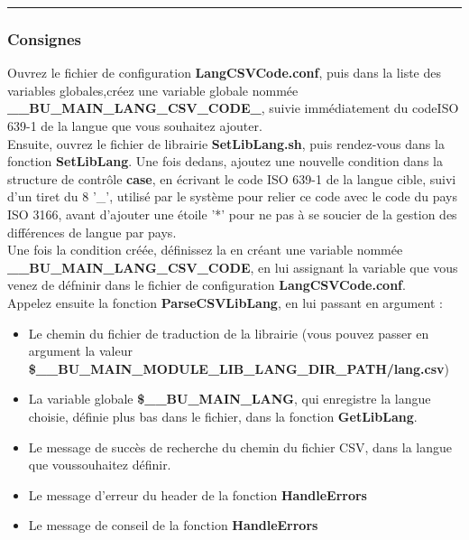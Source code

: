 \documentclass[a4paper,10pt]{article}
\begin{document}
\color{blue}\par\noindent\rule{\textwidth}{0.4pt}\color{white}

\color{blue}
\subsubsection{Consignes}\color{white}
Ouvrez le fichier de configuration \textbf{\color{lime}LangCSVCode.conf}, puis dans la liste des variables globales,\linebreak créez une variable globale nommée \textbf{\color{orange}\_\_BU\_MAIN\_LANG\_CSV\_CODE\_}, suivie immédiatement du code\linebreak ISO 639-1 de la langue que vous souhaitez ajouter.\\[1\baselineskip]

Ensuite, ouvrez le fichier de librairie \textbf{\color{lime}SetLibLang.sh}, puis rendez-vous dans la fonction \textbf{\color{mauve}SetLibLang}. Une fois dedans, ajoutez une nouvelle condition dans la structure de contrôle \textbf{case}, en écrivant le code ISO 639-1 de la langue cible, suivi d'un tiret du 8 '\_', utilisé par le système pour relier ce code avec le code du pays ISO 3166, avant d'ajouter une étoile '*' pour ne pas à se soucier de la gestion des différences de langue par pays.\\[1\baselineskip]

Une fois la condition créée, définissez la en créant une variable nommée \textbf{\color{orange}\_\_BU\_MAIN\_LANG\_CSV\_CODE}, en lui assignant la variable que vous venez de défninir dans le fichier de configuration \textbf{\color{lime}LangCSVCode.conf}.\\[1\baselineskip]

Appelez ensuite la fonction \textbf{\color{mauve}ParseCSVLibLang}, en lui passant en argument : 
\begin{itemize}
    \item Le chemin du fichier de traduction de la librairie (vous pouvez passer en argument la valeur \textbf{\color{orange}\$\_\_BU\_MAIN\_MODULE\_LIB\_LANG\_DIR\_PATH\color{lime}/lang.csv})
    \item La variable globale \textbf{\color{orange}\$\_\_BU\_MAIN\_LANG}, qui enregistre la langue choisie, définie plus bas dans le fichier, dans la fonction \textbf{\color{mauve}GetLibLang}.
    \item Le message de succès de recherche du chemin du fichier CSV, dans la langue que vous\linebreak souhaitez définir.
    \item Le message d'erreur du header de la fonction \textbf{\color{mauve}HandleErrors}
    \item Le message de conseil de la fonction \textbf{\color{mauve}HandleErrors}\\[1\baselineskip]
\end{itemize}
\end{document}
